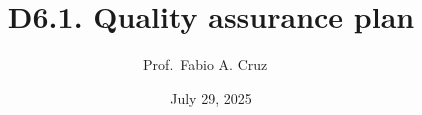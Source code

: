 \documentclass[
  12pt,
  oneside]{book}
\title{D6.1. Quality assurance plan}
\author{Prof.~Fabio A. Cruz ~}
\date{July 29, 2025}
\begin{document}
  \begin{frontmatter}
  \begin{titlepage}




  \BgThispage


  \begin{minipage}[b][0.78\textheight][s]{0.65\textwidth}

    \raggedright
    
    \vfill


\end{minipage}
\end{titlepage}
\end{frontmatter}
\end{document}
